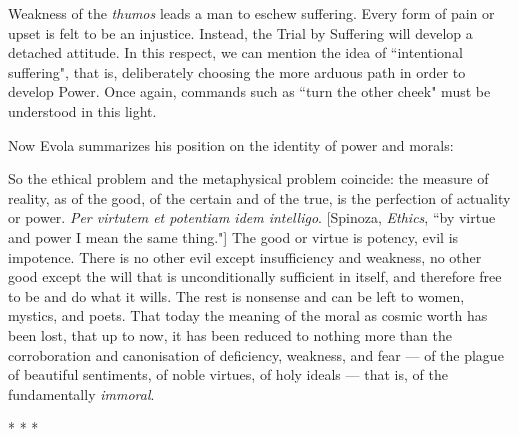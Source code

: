 Weakness of the \emph{thumos} leads a man to eschew suffering. Every form of pain or upset is felt to be an injustice. Instead, the Trial by Suffering will develop a detached attitude. In this respect, we can mention the idea of ``intentional suffering", that is, deliberately choosing the more arduous path in order to develop Power. Once again, commands such as ``turn the other cheek" must be understood in this light.

Now Evola summarizes his position on the identity of power and morals:

\begin{quotex}
So the ethical problem and the metaphysical problem coincide: the measure of reality, as of the good, of the certain and of the true, is the perfection of actuality or power. \emph{Per virtutem et potentiam idem intelligo}. [Spinoza, \emph{Ethics}, ``by virtue and power I mean the same thing."] The good or virtue is potency, evil is impotence. There is no other evil except insufficiency and weakness, no other good except the will that is unconditionally sufficient in itself, and therefore free to be and do what it wills. The rest is nonsense and can be left to women, mystics, and poets. That today the meaning of the moral as cosmic worth has been lost, that up to now, it has been reduced to nothing more than the corroboration and canonisation of deficiency, weakness, and fear — of the plague of beautiful sentiments, of noble virtues, of holy ideals — that is, of the fundamentally \emph{immoral}. 

\end{quotex}



\begin{center}* * *\end{center}


